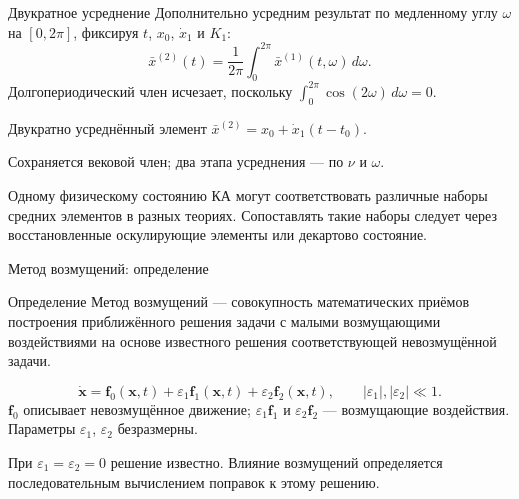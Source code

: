 \documentclass[11pt,aspectratio=169,t]{beamer}
\begin{document}
\begin{frame}{Двукратное усреднение}
\setlength{\abovedisplayskip}{4pt}\setlength{\belowdisplayskip}{4pt}
\justifying
Дополнительно усредним результат по медленному углу $\omega$ на $[0,2\pi]$, фиксируя $t$, $x_0$, $\dot x_1$ и $K_1$:
\[
\bar x^{(2)}(t)=\frac{1}{2\pi}\int_0^{2\pi}\bar x^{(1)}(t,\omega)\,d\omega.
\]
Долгопериодический член исчезает, поскольку
$\int_0^{2\pi}\cos(2\omega)\,d\omega=0$.
\begin{block}{Двукратно усреднённый элемент}
\centering
$\displaystyle\bar x^{(2)}=x_0+\dot x_1(t-t_0).$\par
\end{block}
\justifying
Сохраняется вековой член; два этапа усреднения --- по $\nu$ и $\omega$.\par\smallskip
Одному физическому состоянию КА могут соответствовать различные наборы средних элементов в разных теориях. Сопоставлять такие наборы следует через восстановленные оскулирующие элементы или декартово состояние.
\end{frame}

\begin{frame}{Метод возмущений: определение}
\setlength{\abovedisplayskip}{4pt}\setlength{\belowdisplayskip}{4pt}
\begin{block}{Определение}
\justifying
Метод возмущений --- совокупность математических приёмов построения приближённого решения задачи с малыми возмущающими воздействиями на основе известного решения соответствующей невозмущённой задачи.
\end{block}
\[
\dot{\mathbf x}=\mathbf f_0(\mathbf x,t)
+\varepsilon_1\mathbf f_1(\mathbf x,t)+\varepsilon_2\mathbf f_2(\mathbf x,t),
\qquad |\varepsilon_1|,|\varepsilon_2|\ll1.
\]
\justifying
$\mathbf f_0$ описывает невозмущённое движение; $\varepsilon_1\mathbf f_1$ и $\varepsilon_2\mathbf f_2$ --- возмущающие воздействия. Параметры $\varepsilon_1$, $\varepsilon_2$ безразмерны.\par\smallskip
При $\varepsilon_1=\varepsilon_2=0$ решение известно. Влияние возмущений определяется последовательным вычислением поправок к этому решению.
\end{frame}
\end{document}

